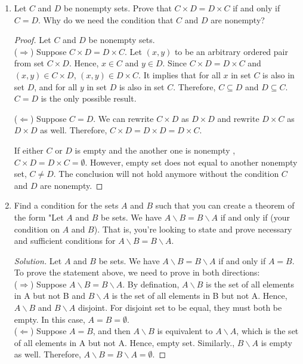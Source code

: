 \documentclass[12pt]{article}
\renewcommand\qedsymbol{$\blacksquare$}
\newenvironment{solution}
{\begin{proof}[Solution]\renewcommand\qedsymbol{$\square$}}
	{\end{proof}}
\begin{document}
	\begin{enumerate}
		\item
		Let $C$ and $D$ be nonempty sets. Prove that $C \times D = D\times C$ if and only if $C=D$. Why do we need the condition that $C$ and $D$ are nonempty?\\
		    \begin{proof}
		   	Let $C$ and $D$ be nonempty sets.\\
			($\Rightarrow$)  Suppose $C \times D = D \times C$. Let $(x,y)$ to be an arbitrary ordered pair from set $C \times D$. Hence, $x \in C$ and $y \in D$. Since $C \times D = D\times C$ and $(x,y) \in C \times D$, $(x,y) \in D \times C$. It implies that for all $x$ in set $C$ is also in set $D$, and for all $y$ in set $D$ is also in set $C$. Therefore, $C \subseteq D$ and $D \subseteq C$. $C=D$ is the only possible result.		
			
			($\Leftarrow$) Suppose $C = D$. We can rewrite $C \times D$ as $D \times D$ and rewrite $ D \times C$ as $D \times D$ as well. Therefore, $C \times D = D \times D = D \times C$.
			
			If either $C$ or $D$ is empty and the another one is nonempty , $C \times D = D \times C = \emptyset$. However, empty set does not equal to another nonempty set, $ C \neq D$. The conclusion will not hold anymore without the condition $C$ and $D$ are nonempty.	
	
			\end{proof}
		
		\item
		Find a condition for the sets $A$ and $B$ such that you can create a theorem of the form "Let $A$ and $B$ be sets. We have $A\backslash B = B\backslash A$ if and only if (your condition on $A$ and $B$). That is, you're looking to state and prove necessary and sufficient conditions for $A\backslash B = B\backslash A$.
		
		\begin{solution}
	     	Let $A$ and $B$ be sets. We have $A \backslash B = B \backslash A$ if and only if $A=B$.\\
			To prove the statement above, we need to prove in both directions:\\
				($\Rightarrow$) Suppose $ A \backslash B = B \backslash A$. By defination, $A \backslash B$ is the set of all elements in A but not B and $B \backslash A$ is the set of all elements in B but not A. Hence,  $A \backslash B$ and  $B \backslash A$ disjoint. For disjoint set to be equal, they must both be empty. In this case, $A=B=\emptyset$.\\
			($\Leftarrow$) Suppose $A=B$, and then $A\backslash B$ is equivalent to $A \backslash A$, which is the set of all elements in A but not A. Hence, empty set. Similarly., $B\backslash A$ is empty as well. Therefore, $A \backslash B = B \backslash A=\emptyset$.
						\end{solution}
		

\end{enumerate}
\end{document}

